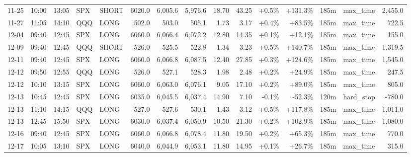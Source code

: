 \documentclass[11pt,a4paper,twoside]{article}
\begin{document}
\begin{landscape}
\begin{center}
\begin{longtable}{>{\color{txtmain}}l l l l l r r r r r r r r >{\color{txtmain}}l r}
11-25 & 10:00 & 13:05 & SPX & SHORT & 6020.0 & 6,005.6 & 5,976.6 & 18.70 & 43.25 & \textcolor{wingreen}{+0.5\%} & \textcolor{wingreen}{+131.3\%} & 185m & max\_time & \textcolor{wingreen}{2,455.0} \\
11-27 & 11:05 & 14:10 & QQQ & LONG & 502.0 & 503.0 & 505.1 & 1.73 & 3.17 & \textcolor{wingreen}{+0.4\%} & \textcolor{wingreen}{+83.5\%} & 185m & max\_time & \textcolor{wingreen}{722.5} \\
12-04 & 09:40 & 12:45 & SPX & LONG & 6060.0 & 6,066.4 & 6,072.2 & 12.80 & 14.35 & \textcolor{wingreen}{+0.1\%} & \textcolor{wingreen}{+12.1\%} & 185m & max\_time & \textcolor{wingreen}{155.0} \\
12-09 & 09:40 & 12:45 & QQQ & SHORT & 526.0 & 525.5 & 522.8 & 1.34 & 3.23 & \textcolor{wingreen}{+0.5\%} & \textcolor{wingreen}{+140.7\%} & 185m & max\_time & \textcolor{wingreen}{1,319.5} \\
12-11 & 09:40 & 12:45 & SPX & LONG & 6060.0 & 6,066.8 & 6,087.5 & 12.40 & 27.85 & \textcolor{wingreen}{+0.3\%} & \textcolor{wingreen}{+124.6\%} & 185m & max\_time & \textcolor{wingreen}{1,545.0} \\
12-12 & 09:50 & 12:55 & QQQ & LONG & 526.0 & 527.1 & 528.3 & 1.98 & 2.48 & \textcolor{wingreen}{+0.2\%} & \textcolor{wingreen}{+24.9\%} & 185m & max\_time & \textcolor{wingreen}{247.5} \\
12-12 & 10:10 & 13:15 & SPX & LONG & 6060.0 & 6,063.0 & 6,076.1 & 9.05 & 17.10 & \textcolor{wingreen}{+0.2\%} & \textcolor{wingreen}{+89.0\%} & 185m & max\_time & \textcolor{wingreen}{805.0} \\
12-13 & 10:45 & 12:45 & SPX & LONG & 6035.0 & 6,045.5 & 6,037.4 & 14.90 & 7.10 & \textcolor{lossred}{-0.1\%} & \textcolor{lossred}{-52.3\%} & 120m & hard\_stop & \textcolor{lossred}{-780.0} \\
12-13 & 11:10 & 14:15 & QQQ & LONG & 527.0 & 527.6 & 530.1 & 1.43 & 3.12 & \textcolor{wingreen}{+0.5\%} & \textcolor{wingreen}{+117.8\%} & 185m & max\_time & \textcolor{wingreen}{1,011.0} \\
12-13 & 12:45 & 15:50 & SPX & LONG & 6030.0 & 6,037.4 & 6,050.9 & 10.50 & 21.30 & \textcolor{wingreen}{+0.2\%} & \textcolor{wingreen}{+102.9\%} & 185m & max\_time & \textcolor{wingreen}{1,080.0} \\
12-16 & 09:40 & 12:45 & SPX & LONG & 6060.0 & 6,066.8 & 6,078.4 & 11.80 & 19.50 & \textcolor{wingreen}{+0.2\%} & \textcolor{wingreen}{+65.3\%} & 185m & max\_time & \textcolor{wingreen}{770.0} \\
12-17 & 10:05 & 13:10 & SPX & LONG & 6040.0 & 6,044.9 & 6,053.1 & 11.80 & 14.95 & \textcolor{wingreen}{+0.1\%} & \textcolor{wingreen}{+26.7\%} & 185m & max\_time & \textcolor{wingreen}{315.0} \\

\end{longtable}
\end{center}
\end{landscape}
\end{document}

